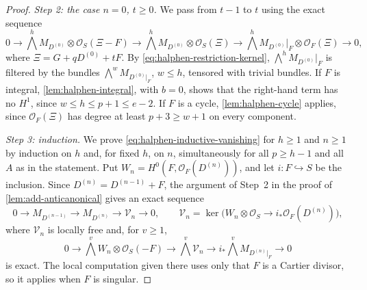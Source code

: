 \documentclass[11pt,reqno]{amsart}
\numberwithin{equation}{section}
\theoremstyle{remark}
\newcommand{\sshf}[1]{\mathcal{O}_{#1}}
\newcommand{\shf}[1]{\mathscr{#1}}
\begin{document}
\begin{proof}
\smallskip\noindent\emph{Step 2: the case \(n=0\), \(t\geq0\).} We pass from \(t-1\) to \(t\) using the exact sequence
\[
 0\to\textstyle\bigwedge^hM_{D^{(0)}}\otimes\sshf{S}(\Xi-F)\to\bigwedge^hM_{D^{(0)}}\otimes\sshf{S}(\Xi)\to\bigwedge^hM_{D^{(0)}}|_F\otimes\sshf{F}(\Xi)\to0,
 \]
where \(\Xi=G+qD^{(0)}+tF\).
By \eqref{eq:halphen-restriction-kernel}, \(\bigwedge^hM_{D^{(0)}}|_F\) is filtered by the bundles \(\bigwedge^wM_{D^{(0)}|_F}\), \(w\leq h\), tensored with trivial bundles. If \(F\) is integral, \cref{lem:halphen-integral}, with \(b=0\), shows that the right-hand term has no \(H^1\), since \(w\leq h\leq p+1\leq e-2\). If \(F\) is a cycle, \cref{lem:halphen-cycle} applies, since \(\sshf{F}(\Xi)\) has degree at least \(p+3\geq w+1\) on every component.

\smallskip\noindent\emph{Step 3: induction.} We prove \eqref{eq:halphen-inductive-vanishing} for \(h\geq1\) and \(n\geq1\) by induction on \(h\) and, for fixed \(h\), on \(n\), simultaneously for all \(p\geq h-1\) and all \(A\) as in the statement. Put \(W_n=H^0(F,\sshf{F}(D^{(n)}))\), and let \(i\colon F\hookrightarrow S\) be the inclusion. Since \(D^{(n)}=D^{(n-1)}+F\), the argument of Step~2 in the proof of \cref{lem:add-anticanonical} gives an exact sequence
\[
 0\longrightarrow M_{D^{(n-1)}}\longrightarrow M_{D^{(n)}}\longrightarrow\shf{V}_n\longrightarrow0,
 \qquad
 \shf{V}_n=\ker\bigl(W_n\otimes\sshf{S}\longrightarrow i_*\sshf{F}(D^{(n)})\bigr),
\]
where \(\shf{V}_n\) is locally free and, for \(v\geq1\),
\begin{equation}\label{eq:halphen-elementary-wedge}
 0\longrightarrow\bigwedge^vW_n\otimes\sshf{S}(-F)
 \longrightarrow\bigwedge^v\shf{V}_n
 \longrightarrow i_*\bigwedge^vM_{D^{(n)}|_F}\longrightarrow0
\end{equation}
is exact. The local computation given there uses only that \(F\) is a Cartier divisor, so it applies when \(F\) is singular.


\end{proof}
\end{document}
